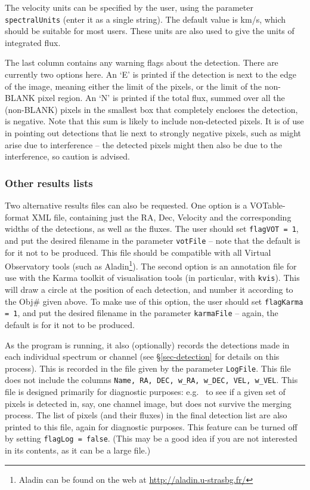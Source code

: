 \documentclass[12pt,a4paper]{article}
\newcommand{\eg}{e.g.\ }
\begin{document}
The velocity units can be specified by the user, using the parameter
\texttt{spectralUnits} (enter it as a single string). The default value
is km/s, which should be suitable for most users. These units are also
used to give the units of integrated flux. 

The last column contains any warning flags about the detection. There
are currently two options here. An `E' is printed if the detection is
next to the edge of the image, meaning either the limit of the pixels,
or the limit of the non-BLANK pixel region. An `N' is printed if the
total flux, summed over all the (non-BLANK) pixels in the smallest box
that completely encloses the detection, is negative. Note that this
sum is likely to include non-detected pixels. It is of use in
pointing out detections that lie next to strongly negative pixels,
such as might arise due to interference -- the detected pixels might
then also be due to the interference, so caution is advised.

\subsubsection{Other results lists}

Two alternative results files can also be requested. One option is a
VOTable-format XML file, containing just the RA, Dec, Velocity and the
corresponding widths of the detections, as well as the fluxes. The
user should set \texttt{flagVOT = 1}, and put the desired filename in the
parameter \texttt{votFile} -- note that the default is for it not to be
produced. This file should be compatible with all Virtual Observatory
tools (such as Aladin\footnote{ Aladin can be found on the web at
\href{http://aladin.u-strasbg.fr/}{http://aladin.u-strasbg.fr/}}). The
second option is an annotation file for use with the Karma toolkit of
visualisation tools (in particular, with \texttt{kvis}). This will draw a
circle at the position of each detection, and number it according to
the Obj\# given above. To make use of this option, the user should
set \texttt{flagKarma = 1}, and put the desired filename in the parameter
\texttt{karmaFile} -- again, the default is for it not to be produced.

As the program is running, it also (optionally) records the detections
made in each individual spectrum or channel (see
\S\ref{sec-detection} for details on this process). This is
recorded in the file given by the parameter \texttt{LogFile}. This file
does not include the columns \texttt{Name, RA, DEC, w\_RA, w\_DEC, VEL,
w\_VEL}. This file is designed primarily for diagnostic purposes: \eg
to see if a given set of pixels is detected in, say, one channel
image, but does not survive the merging process. The list of pixels
(and their fluxes) in the final detection list are also printed to
this file, again for diagnostic purposes. This feature can be turned
off by setting \texttt{flagLog = false}. (This may be a good idea if you
are not interested in its contents, as it can be a large file.)
\end{document}
